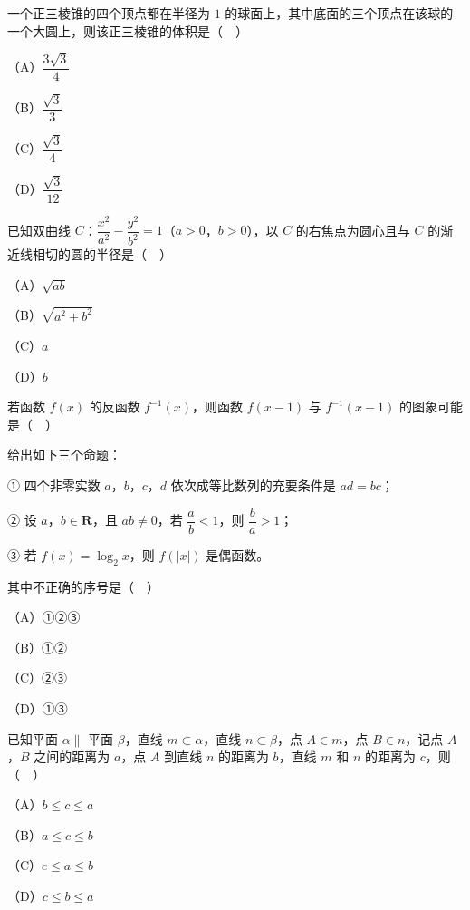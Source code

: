 \begin{question}
一个正三棱锥的四个顶点都在半径为 $1$ 的球面上，其中底面的三个顶点在该球的一个大圆上，则该正三棱锥的体积是（　）

（A）$\dfrac{3\sqrt3}{4}$

（B）$\dfrac{\sqrt3}{3}$

（C）$\dfrac{\sqrt3}{4}$

（D）$\dfrac{\sqrt3}{12}$

\end{question}
\begin{question}
已知双曲线 $C$：$\dfrac{x^2}{a^2}-\dfrac{y^2}{b^2}=1$（$a>0$，$b>0$），以 $C$ 的右焦点为圆心且与 $C$ 的渐近线相切的圆的半径是（　）

（A）$\sqrt{ab}$

（B）$\sqrt{a^2+b^2}$

（C）$a$

（D）$b$

\Needspace{0.4\textheight}
\end{question}
\begin{question}
若函数 $f(x)$ 的反函数 $f^{-1}(x)$，则函数 $f(x-1)$ 与 $f^{-1}(x-1)$ 的图象可能是（　）
\nopagebreak[4]
\begin{center}\end{center}
\nopagebreak[4]
\end{question}
\begin{question}
给出如下三个命题：

① 四个非零实数 $a$，$b$，$c$，$d$ 依次成等比数列的充要条件是 $ad=bc$；

② 设 $a$，$b\in\mathbf R$，且 $ab\neq0$，若 $\dfrac ab<1$，则 $\dfrac ba>1$；

③ 若 $f(x)=\log_2x$，则 $f(|x|)$ 是偶函数。

其中不正确的序号是（　）

（A）①②③

（B）①②

（C）②③

（D）①③

\end{question}
\begin{question}
已知平面 $\alpha\parallel$ 平面 $\beta$，直线 $m\subset\alpha$，直线 $n\subset\beta$，点 $A\in m$，点 $B\in n$，记点 $A$，$B$ 之间的距离为 $a$，点 $A$ 到直线 $n$ 的距离为 $b$，直线 $m$ 和 $n$ 的距离为 $c$，则（　）

（A）$b\leqslant c\leqslant a$

（B）$a\leqslant c\leqslant b$

（C）$c\leqslant a\leqslant b$

（D）$c\leqslant b\leqslant a$

\end{question}

